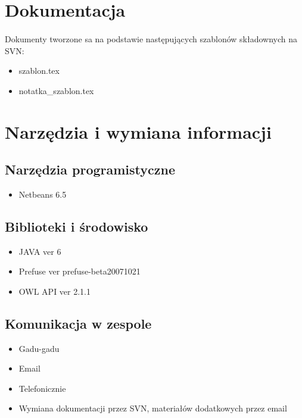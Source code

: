 \documentclass[a4paper,10pt]{article}
\begin{document}

\section{Dokumentacja}

\paragraph{} Dokumenty tworzone sa na podstawie następujących szablonów składownych na SVN:
\begin{itemize}
 \item szablon.tex
\item notatka\_szablon.tex
\end{itemize}



\section{Narzędzia i wymiana informacji}
\subsection{Narzędzia programistyczne}
\begin{itemize}
 \item Netbeans 6.5
 
\end{itemize}
\subsection{Biblioteki i środowisko}
\begin{itemize}
	\item JAVA ver 6
  	\item Prefuse ver prefuse-beta20071021
	\item OWL API ver 2.1.1
\end{itemize}

\subsection{Komunikacja w zespole}
\begin{itemize}
 	\item Gadu-gadu
	\item Email
	\item Telefonicznie
	\item Wymiana dokumentacji przez SVN, materiałów dodatkowych przez email
\end{itemize}
\end{document}
